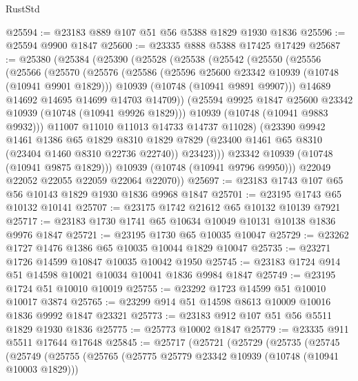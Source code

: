 \begin{lexlean}{RustStd}
\begin{coremodule}
@25594 := @23183 @889 @107 @51 @56 @5388 @1829 @1930 @1836
@25596 := @25594 @9900 @1847
@25600 := @23335 @888 @5388 @17425 @17429
@25687 := @25380
    (@25384
      (@25390
        (@25528
          (@25538
            (@25542
              (@25550
                (@25556
                  (@25566
                    (@25570
                      (@25576
                        (@25586
                          (@25596 @25600 @23342 @10939 (@10748 (@10941 @9901 @1829)))
                          @10939
                          (@10748 (@10941 @9891 @9907)))
                        @14689
                        @14692
                        @14695
                        @14699
                        @14703
                        @14709))
                    (@25594 @9925 @1847 @25600 @23342 @10939 (@10748 (@10941 @9926 @1829)))
                    @10939
                    (@10748 (@10941 @9883 @9932)))
                  @11007
                  @11010
                  @11013
                  @14733
                  @14737
                  @11028)
                (@23390
                  @9942
                  @1461
                  @1386
                  @65
                  @1829
                  @8310
                  @1829
                  @7829
                  (@23400 @1461 @65 @8310 (@23404 @1460 @8310 @22736 @22740))
                  @23423)))
            @23342
            @10939
            (@10748 (@10941 @9875 @1829)))
          @10939
          (@10748 (@10941 @9796 @9950)))
        @22049
        @22052
        @22055
        @22059
        @22064
        @22070))
@25697 := @23183 @1743 @107 @65 @56 @10143 @1829 @1930 @1836 @9968 @1847
@25701 := @23195 @1743 @65 @10132 @10141
@25707 := @23175 @1742 @21612 @65 @10132 @10139 @7921
@25717 := @23183 @1730 @1741 @65 @10634 @10049 @10131 @10138 @1836 @9976 @1847
@25721 := @23195 @1730 @65 @10035 @10047
@25729 := @23262 @1727 @1476 @1386 @65 @10035 @10044 @1829 @10047
@25735 := @23271 @1726 @14599 @10847 @10035 @10042 @1950
@25745 := @23183 @1724 @914 @51 @14598 @10021 @10034 @10041 @1836 @9984 @1847
@25749 := @23195 @1724 @51 @10010 @10019
@25755 := @23292 @1723 @14599 @51 @10010 @10017 @3874
@25765 := @23299 @914 @51 @14598 @8613 @10009 @10016 @1836 @9992 @1847 @23321
@25773 := @23183 @912 @107 @51 @56 @5511 @1829 @1930 @1836
@25775 := @25773 @10002 @1847
@25779 := @23335 @911 @5511 @17644 @17648
@25845 := @25717
    (@25721
      (@25729
        (@25735
          (@25745
            (@25749
              (@25755
                (@25765
                  (@25775 @25779 @23342 @10939 (@10748 (@10941 @10003 @1829)))

\end{coremodule}
\end{lexlean}
